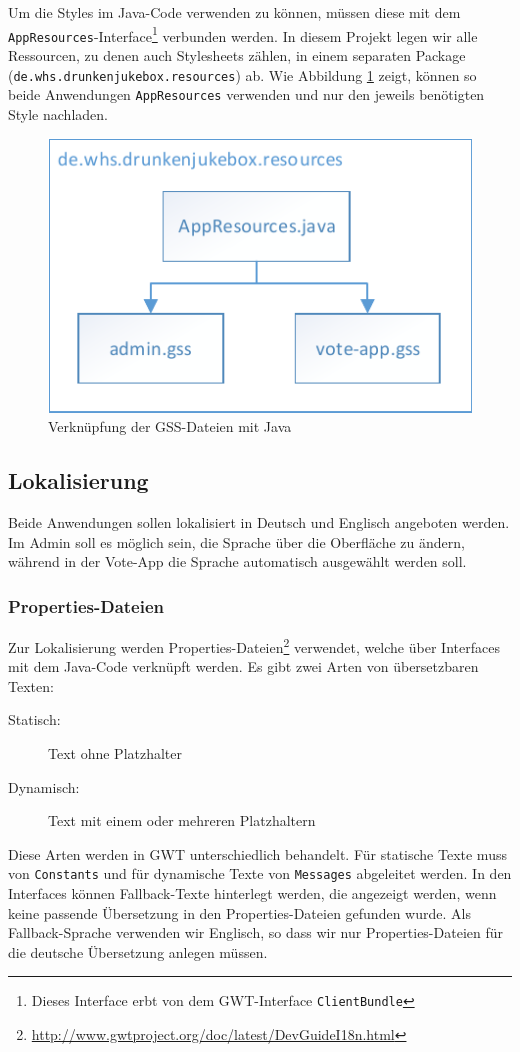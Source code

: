 Um die Styles im Java-Code verwenden zu können, müssen diese mit dem \texttt{AppResources}-Interface\footnote{Dieses Interface erbt von dem GWT-Interface \texttt{ClientBundle}} verbunden werden.
In diesem Projekt legen wir alle Ressourcen, zu denen auch Stylesheets zählen, in
einem separaten Package (\texttt{de.whs.drunkenjukebox.resources}) ab. Wie Abbildung
\ref{fig:GSS} zeigt, können so beide Anwendungen \texttt{AppResources} verwenden
und nur den jeweils benötigten Style nachladen.

\begin{figure}[tbh]
\centering
\includegraphics[width=0.6\linewidth]{Bilder/GSS}
\caption{Verknüpfung der GSS-Dateien mit Java}
\label{fig:GSS}
\end{figure}


\subsection{Lokalisierung}
Beide Anwendungen sollen lokalisiert in Deutsch und Englisch angeboten werden.
Im Admin soll es möglich sein, die Sprache über die Oberfläche zu ändern, während
in der Vote-App die Sprache automatisch ausgewählt werden soll.

\subsubsection{Properties-Dateien}

Zur Lokalisierung werden Properties-Dateien\footnote{\url{http://www.gwtproject.org/doc/latest/DevGuideI18n.html}} verwendet, welche über Interfaces
mit dem Java-Code verknüpft werden. Es gibt zwei Arten von übersetzbaren Texten:
\begin{description}
	\item[Statisch:] Text ohne Platzhalter
	\item[Dynamisch:] Text mit einem oder mehreren Platzhaltern
\end{description}
Diese Arten werden in GWT unterschiedlich behandelt. Für statische Texte muss
von \texttt{Constants} und für dynamische Texte von \texttt{Messages} abgeleitet werden. In den Interfaces können Fallback-Texte hinterlegt werden, die angezeigt werden, wenn keine passende Übersetzung in den Properties-Dateien gefunden wurde. Als
Fallback-Sprache verwenden wir Englisch, so dass wir nur Properties-Dateien für
die deutsche Übersetzung anlegen müssen.

